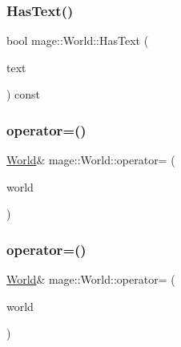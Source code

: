 \hypertarget{classmage_1_1_world_a3da4356b76c0c8fe7d1fd99ebf000e74}{}\label{classmage_1_1_world_a3da4356b76c0c8fe7d1fd99ebf000e74} 
\subsubsection{\texorpdfstring{Has\+Text()}{HasText()}}
{\footnotesize\ttfamily bool mage\+::\+World\+::\+Has\+Text (\begin{DoxyParamCaption}\item[{const \hyperlink{namespacemage_a1e01ae66713838a7a67d30e44c67703e}{Shared\+Ptr}$<$ \hyperlink{classmage_1_1_sprite_text}{Sprite\+Text} $>$}]{text }\end{DoxyParamCaption}) const}

\hypertarget{classmage_1_1_world_aa7074e3847c9fbe1466aa833f194eed0}{}\label{classmage_1_1_world_aa7074e3847c9fbe1466aa833f194eed0} 
\subsubsection{\texorpdfstring{operator=()}{operator=()}\hspace{0.1cm}{\footnotesize\ttfamily [1/2]}}
{\footnotesize\ttfamily \hyperlink{classmage_1_1_world}{World}\& mage\+::\+World\+::operator= (\begin{DoxyParamCaption}\item[{const \hyperlink{classmage_1_1_world}{World} \&}]{world }\end{DoxyParamCaption})\hspace{0.3cm}{\ttfamily [delete]}}

\hypertarget{classmage_1_1_world_a0440e945dfd0291174ce6dc33e5d8335}{}\label{classmage_1_1_world_a0440e945dfd0291174ce6dc33e5d8335} 
\subsubsection{\texorpdfstring{operator=()}{operator=()}\hspace{0.1cm}{\footnotesize\ttfamily [2/2]}}
{\footnotesize\ttfamily \hyperlink{classmage_1_1_world}{World}\& mage\+::\+World\+::operator= (\begin{DoxyParamCaption}\item[{\hyperlink{classmage_1_1_world}{World} \&\&}]{world }\end{DoxyParamCaption})\hspace{0.3cm}{\ttfamily [delete]}}

